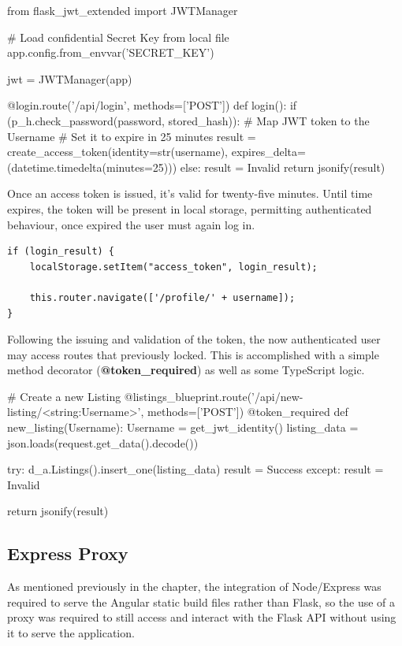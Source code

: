 \begin{python}[caption=Issuing a limited JWT Token ]
from flask_jwt_extended import JWTManager

# Load confidential Secret Key from local file
app.config.from_envvar('SECRET_KEY')

jwt = JWTManager(app)

@login.route('/api/login', methods=['POST'])
def login():
    if (p_h.check_password(password, stored_hash)): 
        # Map JWT token to the Username
        # Set it to expire in 25 minutes
        result = create_access_token(identity=str(username), expires_delta=(datetime.timedelta(minutes=25)))
    else:
        result = Invalid
    return jsonify(result)
\end{python}
      
\newpage
Once an access token is issued, it's valid for twenty-five minutes. Until time expires, the token will be present in local storage, permitting authenticated behaviour, once expired the user must again log in.

\begin{lstlisting}[caption=Storing the Authentication Token]
if (login_result) {
    localStorage.setItem("access_token", login_result);
    
    this.router.navigate(['/profile/' + username]);
}
\end{lstlisting}

Following the issuing and validation of the token, the now authenticated user may access routes that previously locked. This is accomplished with a simple method decorator (\textbf{@token\_required}) as well as some TypeScript logic. \newline

\begin{python}[caption=Issuing a limited JWT Token]
# Create a new Listing
@listings_blueprint.route('/api/new-listing/<string:Username>', methods=['POST'])
@token_required
def new_listing(Username):
    Username = get_jwt_identity()
    listing_data = json.loads(request.get_data().decode())
   
    try: 
        d_a.Listings().insert_one(listing_data) 
        result = Success
    except:
        result = Invalid
    
    return jsonify(result)
\end{python}

\subsection{Express Proxy}
As mentioned previously in the chapter, the integration of Node/Express was required to serve the Angular static build files rather than Flask, so the use of a proxy was required to still access and interact with the Flask API without using it to serve the application.

